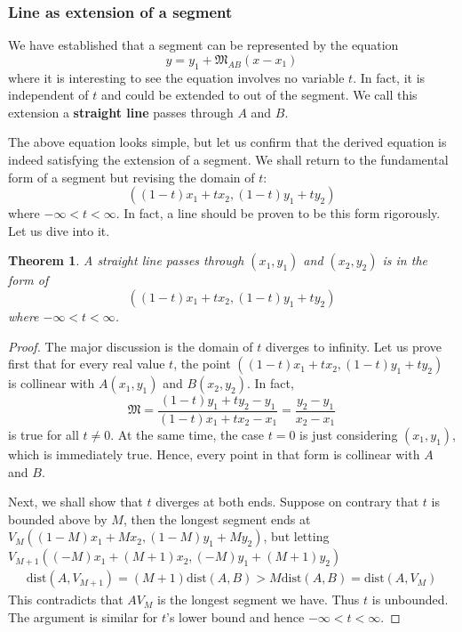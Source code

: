 \documentclass[12pt]{article}
\newtheorem*{theorem}{Theorem}
\begin{document}
    \subsubsection{Line as extension of a segment}

    We have established that a segment can be represented by the equation $$y=y_1+\mathfrak{M}_{AB}(x-x_1)$$
    where it is interesting to see the equation involves no variable $t$. In fact, it is independent of $t$ and could be extended to out of the segment. We call this extension a \textbf{straight line} passes through $A$ and $B$.

    The above equation looks simple, but let us confirm that the derived equation is indeed satisfying the extension of a segment. We shall return to the fundamental form of a segment but revising the domain of $t$: $$((1-t)x_1+tx_2, (1-t)y_1+ty_2)$$ where $-\infty<t<\infty$. In fact, a line should be proven to be this form rigorously. Let us dive into it.

    \begin{theorem}
        A straight line passes through $(x_1,y_1)$ and $(x_2, y_2)$ is in the form of $$((1-t)x_1+tx_2, (1-t)y_1+ty_2)$$ where $-\infty<t<\infty$.
    \end{theorem}

    \begin{proof}
        The major discussion is the domain of $t$ diverges to infinity. Let us prove first that for every real value $t$, the point $((1-t)x_1+tx_2, (1-t)y_1+ty_2)$ is collinear with $A(x_1,y_1)$ and $B(x_2,y_2)$. In fact, $$\mathfrak{M}=\frac{(1-t)y_1+ty_2-y_1}{(1-t)x_1+tx_2-x_1}=\frac{y_2-y_1}{x_2-x_1}$$ is true for all $t\neq 0$. At the same time, the case $t=0$ is just considering $(x_1,y_1)$, which is immediately true. Hence, every point in that form is collinear with $A$ and $B$.

        Next, we shall show that $t$ diverges at both ends. Suppose on contrary that $t$ is bounded above by $M$, then the longest segment ends at $V_M((1-M)x_1+Mx_2, (1-M)y_1+My_2)$, but letting $V_{M+1}((-M)x_1+(M+1)x_2, (-M)y_1+(M+1)y_2)$\begin{align*}
            \mathrm{dist}(A,V_{M+1})=(M+1)\mathrm{dist}(A,B)>M\mathrm{dist}(A,B)=\mathrm{dist}(A,V_M)
        \end{align*}
        This contradicts that $AV_M$ is the longest segment we have. Thus $t$ is unbounded. The argument is similar for $t$'s lower bound and hence $-\infty<t<\infty$.
    \end{proof}
\end{document}
